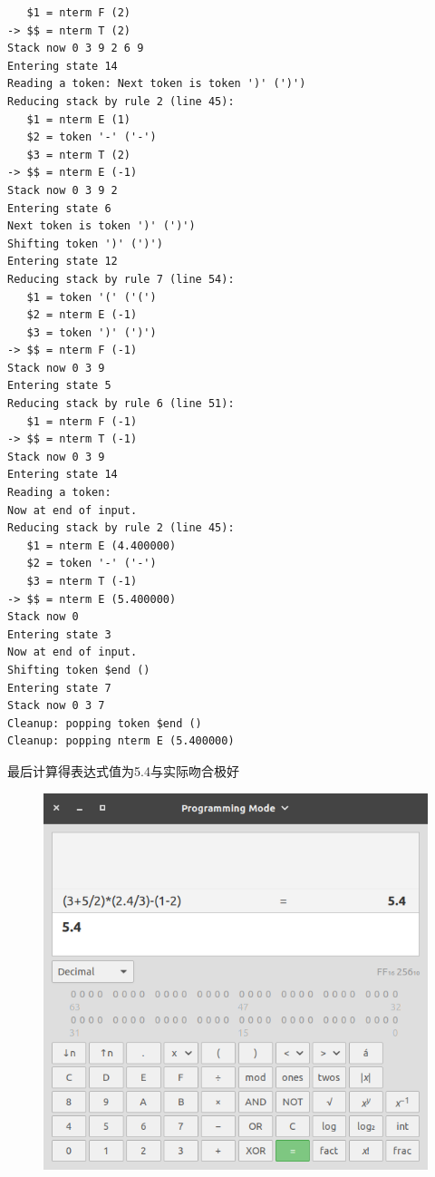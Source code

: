 \begin{verbatim}
   $1 = nterm F (2)
-> $$ = nterm T (2)
Stack now 0 3 9 2 6 9
Entering state 14
Reading a token: Next token is token ')' (')')
Reducing stack by rule 2 (line 45):
   $1 = nterm E (1)
   $2 = token '-' ('-')
   $3 = nterm T (2)
-> $$ = nterm E (-1)
Stack now 0 3 9 2
Entering state 6
Next token is token ')' (')')
Shifting token ')' (')')
Entering state 12
Reducing stack by rule 7 (line 54):
   $1 = token '(' ('(')
   $2 = nterm E (-1)
   $3 = token ')' (')')
-> $$ = nterm F (-1)
Stack now 0 3 9
Entering state 5
Reducing stack by rule 6 (line 51):
   $1 = nterm F (-1)
-> $$ = nterm T (-1)
Stack now 0 3 9
Entering state 14
Reading a token:
Now at end of input.
Reducing stack by rule 2 (line 45):
   $1 = nterm E (4.400000)
   $2 = token '-' ('-')
   $3 = nterm T (-1)
-> $$ = nterm E (5.400000)
Stack now 0
Entering state 3
Now at end of input.
Shifting token $end ()
Entering state 7
Stack now 0 3 7
Cleanup: popping token $end ()
Cleanup: popping nterm E (5.400000)
\end{verbatim}

最后计算得表达式值为5.4与实际吻合极好

\begin{figure}[H]
  \centering
  \includegraphics[scale=0.8]{figures/calc.png}
\end{figure}
